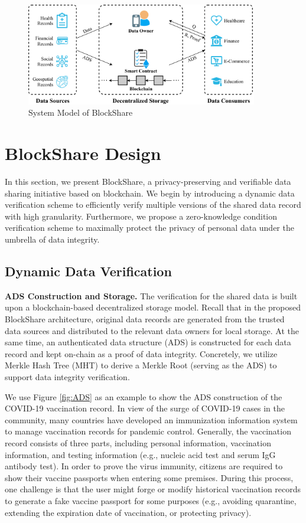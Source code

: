 \documentclass[11pt,divpdfm]{article}
\begin{document}
\begin{figure}[t]
	\centering
	\includegraphics[width=0.9\textwidth]{figs/Fig_System.pdf}
	\caption{System Model of BlockShare}
	\label{fig:System}
\end{figure}


\section{BlockShare Design}
In this section, we present BlockShare, a privacy-preserving and verifiable data sharing initiative based on blockchain.
We begin by introducing a dynamic data verification scheme to efficiently verify multiple versions of the shared data record with high granularity.
Furthermore, we propose a zero-knowledge condition verification scheme to maximally protect the privacy of personal data under the umbrella of data integrity.

\subsection{Dynamic Data Verification}
\textbf{ADS Construction and Storage.}
The verification for the shared data is built upon a blockchain-based decentralized storage model.
Recall that in the proposed BlockShare architecture, original data records are generated from the trusted data sources and distributed to the relevant data owners for local storage.
At the same time, an authenticated data structure (ADS) is constructed for each data record and kept on-chain as a proof of data integrity.
Concretely, we utilize Merkle Hash Tree (MHT) \cite{merkle1989certified} to derive a Merkle Root (serving as the ADS) to support data integrity verification.

We use Figure \ref{fig:ADS} as an example to show the ADS construction of the COVID-19 vaccination record.
In view of the surge of COVID-19 cases in the community, many countries have developed an immunization information system to manage vaccination records for pandemic control.
Generally, the vaccination record consists of three parts, including personal information, vaccination information, and testing information (e.g., nucleic acid test and serum IgG antibody test).
In order to prove the virus immunity, citizens are required to show their vaccine passports when entering some premises.
During this process, one challenge is that the user might forge or modify historical vaccination records to generate a fake vaccine passport for some purposes (e.g., avoiding quarantine, extending the expiration date of vaccination, or protecting privacy).
\end{document}
